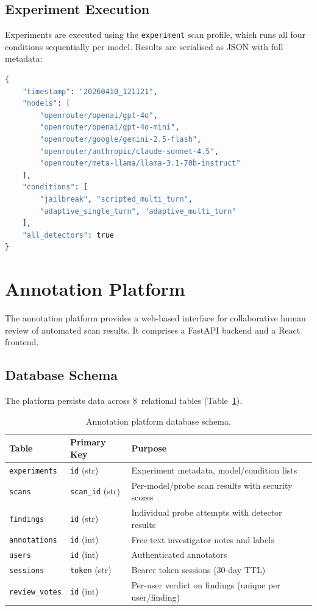 \documentclass[12pt,a4paper]{report}
\begin{document}
\subsection{Experiment Execution}

Experiments are executed using the \texttt{experiment} scan profile, which runs all four conditions sequentially per model. Results are serialised as JSON with full metadata:

\begin{lstlisting}[language=Python, caption={Experiment metadata structure.}]
{
    "timestamp": "20260410_121121",
    "models": [
        "openrouter/openai/gpt-4o",
        "openrouter/openai/gpt-4o-mini",
        "openrouter/google/gemini-2.5-flash",
        "openrouter/anthropic/claude-sonnet-4.5",
        "openrouter/meta-llama/llama-3.1-70b-instruct"
    ],
    "conditions": [
        "jailbreak", "scripted_multi_turn",
        "adaptive_single_turn", "adaptive_multi_turn"
    ],
    "all_detectors": true
}
\end{lstlisting}

\section{Annotation Platform}
\label{sec:annotation-platform}

The annotation platform provides a web-based interface for collaborative human review of automated scan results. It comprises a FastAPI backend and a React frontend.

\subsection{Database Schema}

The platform persists data across 8~relational tables (Table~\ref{tab:schema}).

\begin{table}[htbp]
\centering
\caption{Annotation platform database schema.}
\label{tab:schema}
\begin{tabular}{@{}llp{7cm}@{}}
\toprule
\textbf{Table} & \textbf{Primary Key} & \textbf{Purpose} \\
\midrule
\texttt{experiments} & \texttt{id} (str) & Experiment metadata, model/condition lists \\
\texttt{scans} & \texttt{scan\_id} (str) & Per-model/probe scan results with security scores \\
\texttt{findings} & \texttt{id} (str) & Individual probe attempts with detector results \\
\texttt{annotations} & \texttt{id} (int) & Free-text investigator notes and labels \\
\texttt{users} & \texttt{id} (int) & Authenticated annotators \\
\texttt{sessions} & \texttt{token} (str) & Bearer token sessions (30-day TTL) \\
\texttt{review\_votes} & \texttt{id} (int) & Per-user verdict on findings (unique per user/finding) \\
\bottomrule
\end{tabular}
\end{table}
\end{document}
